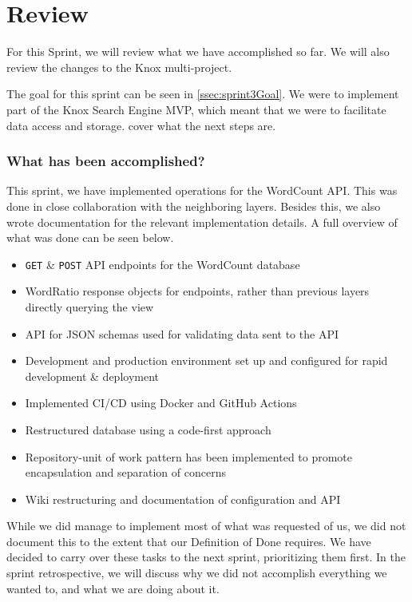 \section{Review}
For this Sprint, we will review what we have accomplished so far. We will also review the changes to the Knox multi-project.

The goal for this sprint can be seen in \ref{ssec:sprint3Goal}. We were to implement part of the Knox Search Engine MVP, which meant that we were to facilitate data access and storage.
cover what the next steps are.

\subsubsection{What has been accomplished?}
This sprint, we have implemented operations for the WordCount API. This was done in close collaboration with the neighboring layers. Besides this, we also wrote documentation for the relevant implementation details. A full overview of what was done can be seen below.

\begin{itemize}
    \item \texttt{GET} \& \texttt{POST} API endpoints for the WordCount database
    \item WordRatio response objects for endpoints, rather than previous layers directly querying the view
    \item API for JSON schemas used for validating data sent to the API
    \item Development and production environment set up and configured for rapid development \& deployment
    \item Implemented CI/CD using Docker and GitHub Actions
    \item Restructured database using a code-first approach
    \item Repository-unit of work pattern has been implemented to promote encapsulation and separation of concerns
    \item Wiki restructuring and documentation of configuration and API
\end{itemize}

While we did manage to implement most of what was requested of us, we did not document this to the extent that our Definition of Done requires. We have decided to carry over these tasks to the next sprint, prioritizing them first. In the sprint retrospective, we will discuss why we did not accomplish everything we wanted to, and what we are doing about it.

